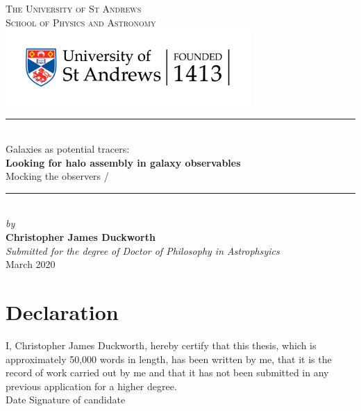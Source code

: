 \documentclass[11pt]{book}
\begin{document}
\pagestyle{empty}

\begin{titlepage}
\newcommand{\HRule}{\rule{\linewidth}{0.5mm}}
\center
\vspace*{0.3cm}
\textsc{\LARGE The University of St Andrews}\\[0.1cm] %
\textsc{\Large School of Physics and Astronomy}\\[3cm] %
\includegraphics[width=0.7\textwidth]{thesis/latex/st_a_logo_.png}

\HRule \\[0.4cm]
{ \LARGE Galaxies as potential tracers: \Large \\[0.2cm] \textbf{Looking for halo assembly in galaxy observables} \\ Mocking the observers / }\\[0.4cm] %
\HRule \\[1.6cm]
\Large
\textsl{by} \\
\textbf{Christopher James Duckworth}
\\
\vspace*{2cm}
\textsl{\Large Submitted for the degree of Doctor of Philosophy in Astrophsyics}\\[0.6cm] %
{\Large {March 2020}}\\[3cm]
\vfill %

\end{titlepage}

\frontmatter

\chapter{Declaration}

I, Christopher James Duckworth, hereby certify that this thesis, which is approximately 50,000 words in length, has been written by me, that it is the record of work carried out by me and that it has not been submitted in any previous application for a higher degree.\\

Date  \hspace{1.8in} Signature of candidate \\
\end{document}

